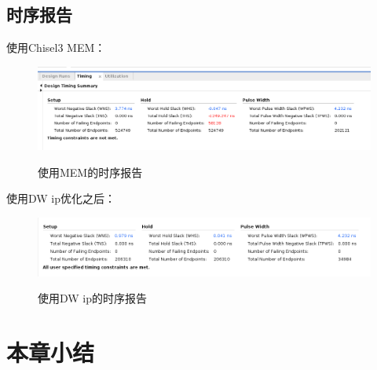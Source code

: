     \subsection{时序报告}
    使用Chisel3 MEM：
    \begin{figure}[h]
        \centering
        \includegraphics[scale=0.4]{../pdf/old_time.png}\\
        \caption{使用MEM的时序报告}
    \end{figure}
    使用DW ip优化之后：
    \begin{figure}[h]
        \centering
        \includegraphics[scale=0.4]{../pdf/new_time.png}\\
        \caption{使用DW ip的时序报告}
    \end{figure}

\section{本章小结}






